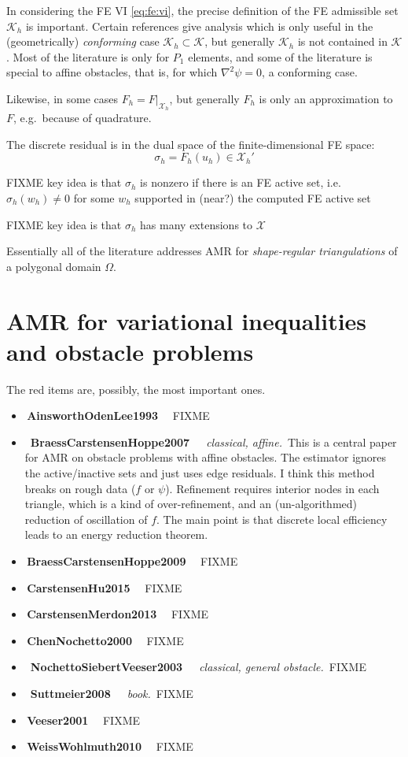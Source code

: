 \documentclass[11pt]{article}
\newcommand{\cK}{\ensuremath{\mathcal{K}}}
\newcommand{\cX}{\ensuremath{\mathcal{X}}}
\newcommand{\grad}{\ensuremath{\nabla}}
\begin{document}
In considering the FE VI \eqref{eq:fe:vi}, the precise definition of the FE admissible set $\cK_h$ is important.  Certain references give analysis which is only useful in the (geometrically) \emph{conforming} case $\cK_h\subset \cK$, but generally $\cK_h$ is not contained in $\cK$ \cite{FochesattoBueler2025}.  Most of the literature is only for $P_1$ elements, and some of the literature is special to affine obstacles, that is, for which $\grad^2 \psi=0$, a conforming case.

Likewise, in some cases $F_h=F|_{\cX_h}$, but generally $F_h$ is only an approximation to $F$, e.g.~because of quadrature.

The discrete residual is in the dual space of the finite-dimensional FE space:
\begin{equation}
\sigma_h = F_h(u_h) \in \cX_h'\label{eq:fe:sigma}
\end{equation}

FIXME key idea is that $\sigma_h$ is nonzero if there is an FE active set, i.e.~$\sigma_h(w_h)\ne 0$ for some $w_h$ supported in (near?) the computed FE active set

FIXME key idea is that $\sigma_h$ has many extensions to $\cX$

Essentially all of the literature addresses AMR for \emph{shape-regular triangulations} \cite{BangerthRannacher2003} of a polygonal domain $\Omega$.


\section{AMR for variational inequalities and obstacle problems}

The {\color{BrickRed} red items} are, possibly, the most important ones.

\newcommand{\nm}[1]{\item \,{\large \textbf{#1}} \, \cite{#1} \,}
\newcommand{\rnm}[1]{\item \,{\large {\color{BrickRed} \textbf{#1}}} \, \cite{#1} \,}
\newcommand{\res}[1]{\,\emph{#1.}\,}

\begin{itemize}
\nm{AinsworthOdenLee1993} FIXME
\rnm{BraessCarstensenHoppe2007}  \res{classical, affine}  This is a central paper for AMR on obstacle problems with affine obstacles.  The estimator ignores the active/inactive sets and just uses edge residuals.  I think this method breaks on rough data ($f$ or $\psi$).  Refinement requires interior nodes in each triangle, which is a kind of over-refinement, and an (un-algorithmed) reduction of oscillation of $f$.  The main point is that discrete local efficiency leads to an energy reduction theorem.
\nm{BraessCarstensenHoppe2009} FIXME
\nm{CarstensenHu2015} FIXME
\nm{CarstensenMerdon2013} FIXME
\nm{ChenNochetto2000} FIXME
\rnm{NochettoSiebertVeeser2003}  \res{classical, general obstacle}  FIXME
\rnm{Suttmeier2008} \res{book} FIXME
\nm{Veeser2001} FIXME
\nm{WeissWohlmuth2010} FIXME
\end{itemize}
\end{document}
